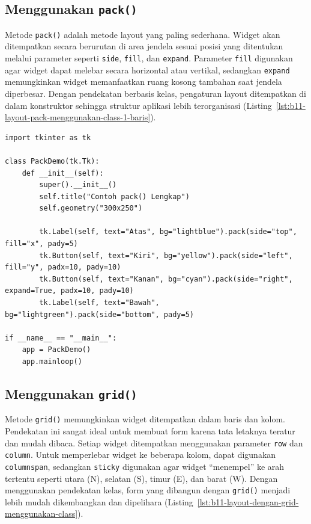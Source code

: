 \subsection{Menggunakan \texttt{pack()}}

Metode \texttt{pack()} adalah metode layout yang paling sederhana. Widget akan ditempatkan secara berurutan di area jendela sesuai posisi yang ditentukan melalui parameter seperti \texttt{side}, \texttt{fill}, dan \texttt{expand}. Parameter \texttt{fill} digunakan agar widget dapat melebar secara horizontal atau vertikal, sedangkan \texttt{expand} memungkinkan widget memanfaatkan ruang kosong tambahan saat jendela diperbesar. Dengan pendekatan berbasis kelas, pengaturan layout ditempatkan di dalam konstruktor sehingga struktur aplikasi lebih terorganisasi (Listing~\ref{lst:b11-layout-pack-menggunakan-class-1-baris}).

\begin{lstlisting}[style=PythonStyle, caption={Contoh Layout pack() Menggunakan Class (1 Baris per pack)}, label={lst:b11-layout-pack-menggunakan-class-1-baris}]
import tkinter as tk

class PackDemo(tk.Tk):
    def __init__(self):
        super().__init__()
        self.title("Contoh pack() Lengkap")
        self.geometry("300x250")

        tk.Label(self, text="Atas", bg="lightblue").pack(side="top", fill="x", pady=5)
        tk.Button(self, text="Kiri", bg="yellow").pack(side="left", fill="y", padx=10, pady=10)
        tk.Button(self, text="Kanan", bg="cyan").pack(side="right", expand=True, padx=10, pady=10)
        tk.Label(self, text="Bawah", bg="lightgreen").pack(side="bottom", pady=5)

if __name__ == "__main__":
    app = PackDemo()
    app.mainloop()
\end{lstlisting}



\subsection{Menggunakan \texttt{grid()}}

Metode \texttt{grid()} memungkinkan widget ditempatkan dalam baris dan kolom. Pendekatan ini sangat ideal untuk membuat form karena tata letaknya teratur dan mudah dibaca. Setiap widget ditempatkan menggunakan parameter \texttt{row} dan \texttt{column}. Untuk memperlebar widget ke beberapa kolom, dapat digunakan \texttt{columnspan}, sedangkan \texttt{sticky} digunakan agar widget “menempel” ke arah tertentu seperti utara (N), selatan (S), timur (E), dan barat (W). Dengan menggunakan pendekatan kelas, form yang dibangun dengan \texttt{grid()} menjadi lebih mudah dikembangkan dan dipelihara (Listing~\ref{lst:b11-layout-dengan-grid-menggunakan-class}).

